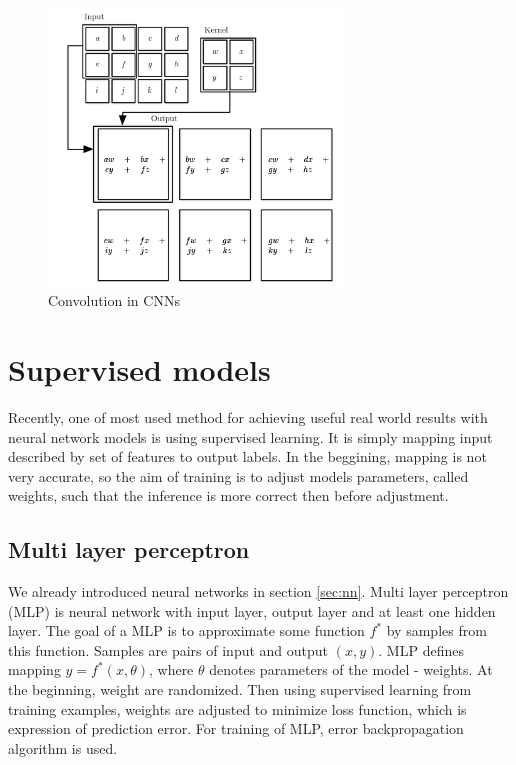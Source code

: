 \begin{figure}
    \centering
    \includegraphics[width=0.7\textwidth]{figs/convo.png}
    \caption{Convolution in CNNs \cite{Goodfellow-et-al-2016}}
    \label{fig:convo}
\end{figure}

\section{Supervised models}

Recently, one of most used method for achieving useful real world results with neural network models is using supervised learning. It is simply mapping input described by set of features to output labels. In the beggining, mapping is not very accurate, so the aim of training is to adjust models parameters, called weights, such that the inference is more correct then before adjustment.

\subsection{Multi layer perceptron}
We already introduced neural networks in section \ref{sec:nn}. Multi layer perceptron (MLP) is neural network with input layer, output layer and at least one hidden layer. The goal of a MLP is to approximate some function $f^*$ by samples from this function. Samples are pairs of input and output $(x, y)$. MLP defines mapping $y = f^*(x, \theta)$, where $\theta$ denotes parameters of the model - weights. At the beginning, weight are randomized. Then using supervised learning from training examples, weights are adjusted to minimize loss function, which is expression of prediction error. For training of MLP, error backpropagation algorithm is used. \cite{Goodfellow-et-al-2016}


